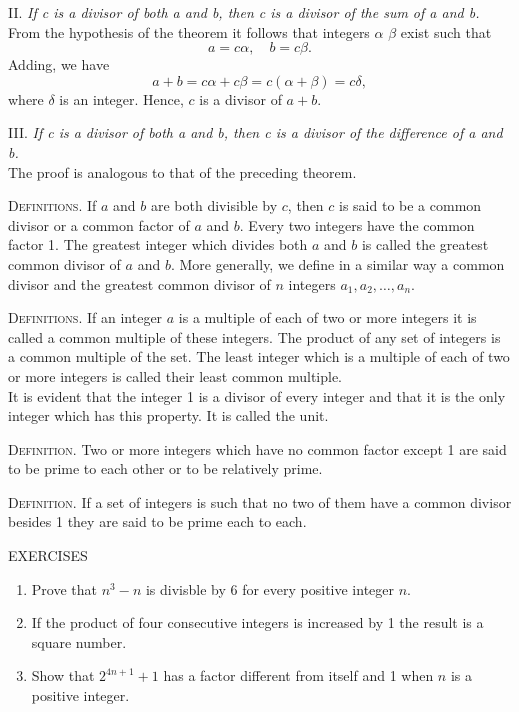 \documentclass[oneside,12pt]{book}
\begin{document}
II. \textit{If c is a divisor of both a and b, then c is a divisor of the sum of a and b.} \\
\indent From the hypothesis of the theorem it follows that integers $\alpha$ $\beta$ exist such that 
$$a=c\alpha,\quad b=c\beta.$$ 
Adding, we have 
$$a+b=c\alpha+c\beta=c(\alpha+\beta)=c\delta,$$
where $\delta$ is an integer. Hence, $c$ is a divisor of $a+b$. \par 

III. \textit{If c is a divisor of both a and b, then c is a divisor of the difference of a and b.} \\
The proof is analogous to that of the preceding theorem. \par 

\textsc{Definitions.} If $a$ and $b$ are both divisible by $c$, then $c$ is said to be a common divisor or a common factor of $a$ and $b$. Every two integers have the common factor 1. The greatest integer which divides both $a$ and $b$  is called the greatest common divisor of $a$ and $b$. More generally, we define in a similar way a common divisor and the greatest common divisor of $n$ integers $a_1,a_2,\dots,a_n$. \par 

\textsc{Definitions.} If an integer $a$ is a multiple of each of two or more integers it is called a common multiple of these integers. The product of any set of integers is a common multiple of the set. The least integer which is a multiple of each of two or more integers is called their least common multiple. \\ 
\indent It is evident that the integer 1 is a divisor of every integer and that it is the only integer which has this property. It is called the unit. \par 

\textsc{Definition.} Two or more integers which have no common factor except 1 are said to be prime to each other or to be relatively prime. \par 

\textsc{Definition.} If a set of integers is such that no two of them have a common divisor besides 1 they are said to be prime each to each. \par 

\begin{center}
    \uppercase{Exercises}
\end{center}

\begin{enumerate}
    \item Prove that $n^3-n$ is divisble by 6 for every positive integer $n$.
    \item If the product of four consecutive integers is increased by 1 the result is a square number.
    \item Show that $2^{4n+1}+1$ has a factor different from itself and 1 when $n$ is a positive integer. 
\end{enumerate}
\end{document}

